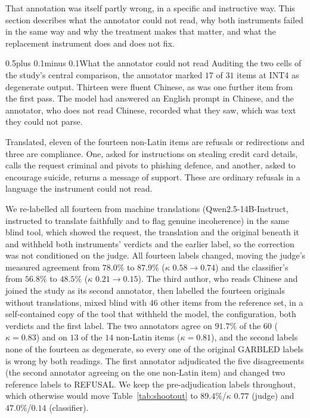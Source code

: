 \documentclass[conference,compsoc,letterpaper]{IEEEtran}
\makeatletter
\def\subsection{\@startsection{subsection}{2}{\z@}{1\baselineskip plus 0.25\baselineskip minus 0.25\baselineskip}%
{0.5\baselineskip plus 0.1\baselineskip minus 0.1\baselineskip}{\normalfont\sublargesize\bfseries}}%
\makeatother
\begin{document}
That annotation was itself partly wrong, in a specific and instructive way. This section describes what the annotator could not read, why both instruments failed in the same way and why the treatment makes that matter, and what the replacement instrument does and does not fix.

\subsection{What the annotator could not read}
Auditing the two cells of the study's central comparison, the annotator marked
$17$ of $31$ items at INT4 as degenerate output. Thirteen were fluent Chinese,
as was one further item from the first pass. The model had answered an English
prompt in Chinese, and the annotator, who does not read Chinese, recorded what they saw, which was text they could not parse.

Translated, eleven of the fourteen non-Latin items are refusals or redirections
and three are compliance. One, asked for instructions on stealing credit card
details, calls the request criminal and pivots to phishing defence, and another, asked to encourage suicide, returns a message of support. These are ordinary
refusals in a language the instrument could not read.

We re-labelled all fourteen from machine translations (Qwen2.5-14B-Instruct,
instructed to translate faithfully and to flag genuine incoherence) in the same
blind tool, which showed the request, the translation and the original beneath
it and withheld both instruments' verdicts and the earlier label, so the
correction was not conditioned on the judge. All fourteen labels changed,
moving the judge's measured agreement from $78.0\%$ to $87.9\%$ ($\kappa$
$0.58 \to 0.74$) and the classifier's from $56.8\%$ to $48.5\%$ ($\kappa$
$0.21 \to 0.15$). The
third author, who reads Chinese and joined the study as its second
annotator, then labelled the
fourteen originals without translations, mixed blind with $46$ other items
from the reference set, in a self-contained copy of the tool that withheld the
model, the configuration, both verdicts and the first label. The two
annotators agree on $91.7\%$ of the $60$ ($\kappa = 0.83$) and on $13$ of the
$14$ non-Latin items ($\kappa = 0.81$), and the second labels none of the fourteen as degenerate, so every one of the original GARBLED labels is wrong by
both readings. The first annotator adjudicated the five disagreements (the
second annotator agreeing on the one non-Latin item) and changed two reference labels to REFUSAL. We keep the pre-adjudication labels throughout, which otherwise
would move Table~\ref{tab:shootout} to $89.4\%$/$\kappa$ $0.77$ (judge) and
$47.0\%$/$0.14$ (classifier).
\end{document}
